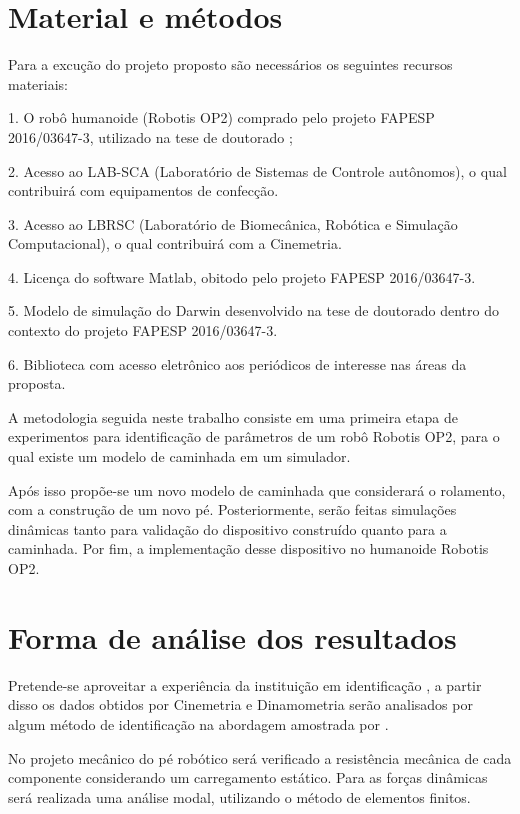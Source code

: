 
\section{Material e métodos}

Para a excução do projeto proposto são necessários os seguintes recursos materiais:

1.	O robô humanoide (Robotis OP2) comprado pelo  projeto FAPESP 2016/03647-3, utilizado na tese de doutorado \cite{tesemarcos};

2.	Acesso ao LAB-SCA (Laboratório de Sistemas de Controle autônomos), o qual contribuirá com equipamentos de confecção.

3.	 Acesso ao LBRSC (Laboratório de Biomecânica, Robótica e Simulação Computacional), o qual contribuirá com a Cinemetria.

4.	Licença do software Matlab, obitodo pelo projeto FAPESP 2016/03647-3.

5.	Modelo de simulação do Darwin desenvolvido na tese de doutorado dentro do contexto do projeto FAPESP 2016/03647-3.

6.	Biblioteca com acesso eletrônico aos periódicos de interesse nas áreas da proposta.



A metodologia seguida neste trabalho consiste em uma primeira etapa de experimentos para identificação de parâmetros de um robô Robotis OP2, para o qual existe um modelo de caminhada em um simulador.

Após isso propõe-se um novo modelo de caminhada que considerará o rolamento, com a construção de um novo pé. Posteriormente, serão feitas simulações dinâmicas tanto para validação do dispositivo construído quanto para a caminhada. Por fim, a implementação desse dispositivo no humanoide Robotis OP2.




\section{Forma de análise dos resultados}

Pretende-se aproveitar a experiência da instituição em identificação \cite{gripp}, a partir disso os dados obtidos por Cinemetria e Dinamometria serão analisados por algum método de identificação na abordagem amostrada por \cite{ident2014,ident2017}.

No projeto mecânico do pé robótico será verificado a resistência mecânica de cada componente considerando um carregamento estático. Para as forças dinâmicas será realizada uma análise modal, utilizando o método de elementos finitos.

